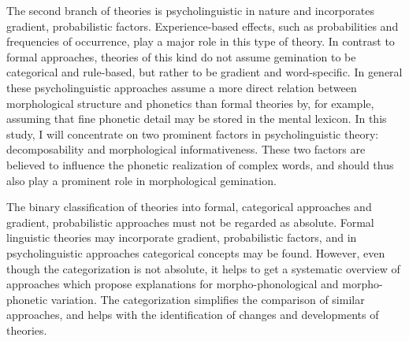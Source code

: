 
The second branch of theories is psycholinguistic in nature and incorporates gradient, probabilistic factors. Experience-based effects, such as probabilities and frequencies of occurrence, play a major role in this type of theory. In contrast to formal approaches, theories of this kind do not assume gemination to be categorical and rule-based, but rather to be gradient and word-specific. In  general these psycholinguistic approaches assume a more direct relation between morphological structure and phonetics than formal theories by, for example, assuming that fine phonetic detail may be stored in the mental lexicon. In this study, I will concentrate on two prominent factors in psycholinguistic theory: decomposability and morphological informativeness. These two factors are believed to influence the phonetic realization of complex words, and should thus also play a prominent role in morphological gemination. 


The binary classification of theories into formal, categorical approaches and gradient, probabilistic approaches must not be regarded as absolute. Formal linguistic theories may incorporate gradient, probabilistic factors, and in psycholinguistic approaches categorical concepts may be found. However, even though the categorization is not absolute, it helps to get a systematic overview of approaches which propose explanations for morpho-phonological and morpho-phonetic variation. The categorization simplifies the comparison of similar approaches, and helps with the identification of changes and developments of theories.

